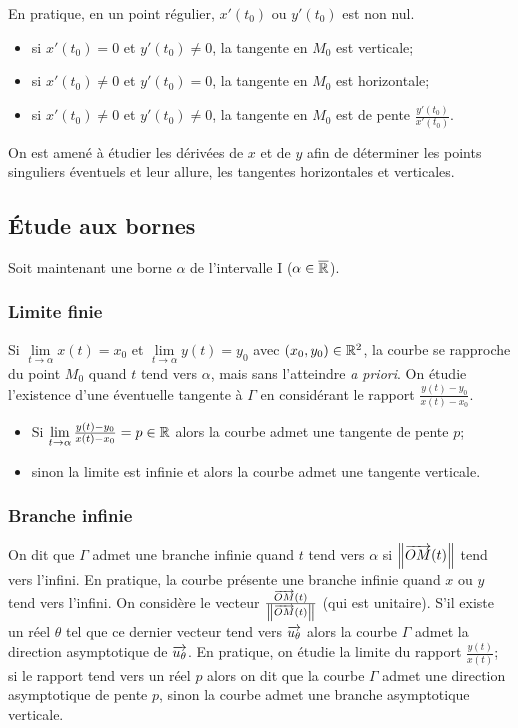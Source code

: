 En pratique, en un point régulier, \(x'(t_0)\) ou \(y'(t_0)\) est non nul.
\begin{itemize}
\item si \(x'(t_0)=0\) et \(y'(t_0) \neq 0\), la tangente en \(M_0\) est verticale;
\item si \(x'(t_0) \neq 0\) et \(y'(t_0) = 0\), la tangente en \(M_0\) est horizontale;
\item si \(x'(t_0) \neq 0\) et \(y'(t_0) \neq 0\), la tangente en \(M_0\) est de pente \(\frac{y'(t_0)}{x'(t_0)}\).
\end{itemize}
On est amené à étudier les dérivées de \(x\) et de \(y\) afin de déterminer les points singuliers éventuels et leur allure, les tangentes horizontales et verticales.

\subsection{Étude aux bornes}
Soit maintenant une borne \(\alpha\) de l'intervalle I (\(\alpha \in \overline{\mathbb{R}}\)).

\subsubsection{Limite finie}
Si \(\lim\limits_{t \to \alpha}{x(t)}=x_0\) et \(\lim\limits_{t \to \alpha}{y(t)}=y_0\) avec \((x_0,y_0) \in \mathbb{R}^2\), la courbe se rapproche du point \(M_0\) quand \(t\) tend vers \(\alpha\), mais sans l'atteindre \emph{a priori}. On étudie l'existence d'une éventuelle tangente à \(\Gamma\) en considérant le rapport \(\frac{y(t)-y_0}{x(t)-x_0}\).
\begin{itemize}
\item Si \(\lim\limits_{t \to \alpha}\frac{y(t)-y_0}{x(t)-x_0}=p \in \mathbb{R}\) alors la courbe admet une tangente de pente \(p\);
\item sinon la limite est infinie et alors la courbe admet une tangente verticale.
\end{itemize}

\subsubsection{Branche infinie}
On dit que \(\Gamma\) admet une branche infinie quand \(t\) tend vers \(\alpha\) si \(\left\lVert\overrightarrow{OM}(t)\right\rVert\) tend vers l'infini. En pratique, la courbe présente une branche infinie quand \(x\) ou \(y\) tend vers l'infini. On considère le vecteur \(\frac{\overrightarrow{OM}(t)}{\left\lVert\overrightarrow{OM}(t)\right\rVert}\) (qui est unitaire). S'il existe un réel \(\theta\) tel que ce dernier vecteur tend vers \(\overrightarrow{u_\theta}\) alors la courbe \(\Gamma\) admet la direction asymptotique de \(\overrightarrow{u_\theta}\). En pratique, on étudie la limite du rapport \(\frac{y(t)}{x(t)}\); si le rapport tend vers un réel \(p\) alors on dit que la courbe \(\Gamma\) admet une direction asymptotique de pente \(p\), sinon la courbe admet une branche asymptotique verticale.

